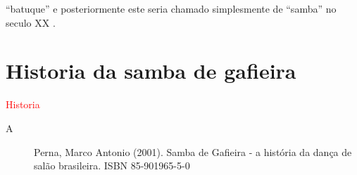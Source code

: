  ``batuque''
e posteriormente este seria chamado simplesmente de ``samba'' no seculo XX \cite[pp. 47]{diniz2008almanaque}.


\section{Historia da samba de gafieira}


\textcolor{red}{Historia}
\begin{description}

\item [A] Perna, Marco Antonio (2001). Samba de Gafieira - a história da dança de salão brasileira. ISBN 85-901965-5-0

\end{description}




